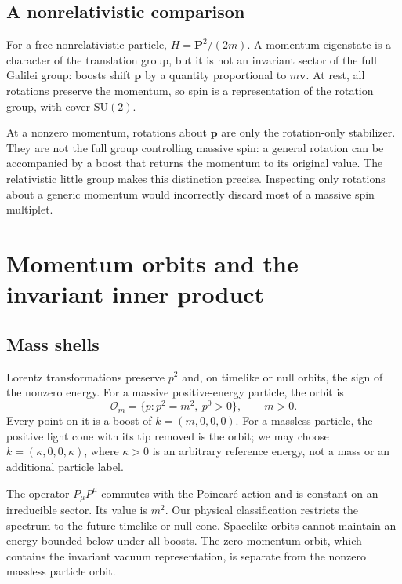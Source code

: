 \documentclass[11pt]{article}
\newcommand{\SU}{\mathrm{SU}}
\begin{document}
\subsection{A nonrelativistic comparison}
For a free nonrelativistic particle,
\(H=\bm P^2/(2m)\). A momentum eigenstate is a character of the
translation group, but it is not an invariant sector of the full
Galilei group: boosts shift \(\bm p\) by a quantity proportional to
\(m\bm v\). At rest, all rotations preserve the momentum, so spin
is a representation of the rotation group, with cover \(\SU(2)\).

At a nonzero momentum, rotations about \(\bm p\) are only the
rotation-only stabilizer. They are not the full group controlling
massive spin: a general rotation can be accompanied by a boost that
returns the momentum to its original value. The relativistic little
group makes this distinction precise. Inspecting only rotations
about a generic momentum would incorrectly discard most of a massive
spin multiplet.

\section{Momentum orbits and the invariant inner product}
\subsection{Mass shells}
Lorentz transformations preserve \(p^2\) and, on timelike or null
orbits, the sign of the nonzero energy. For a massive positive-energy
particle, the orbit is
\begin{equation}
 \mathcal O_m^+=\{p:p^2=m^2,\ p^0>0\},\qquad m>0.
 \label{eq:massshell}
\end{equation}
Every point on it is a boost of \(k=(m,0,0,0)\). For a massless
particle, the positive light cone with its tip removed is the orbit;
we may choose \(k=(\kappa,0,0,\kappa)\), where \(\kappa>0\) is
an arbitrary reference energy, not a mass or an additional particle label.

The operator \(P_\mu P^\mu\) commutes with the Poincar\'e action and
is constant on an irreducible sector. Its value is \(m^2\).
Our physical classification restricts the spectrum to the future
timelike or null cone. Spacelike orbits cannot maintain an energy
bounded below under all boosts. The zero-momentum orbit, which
contains the invariant vacuum representation, is separate from the
nonzero massless particle orbit.
\end{document}

